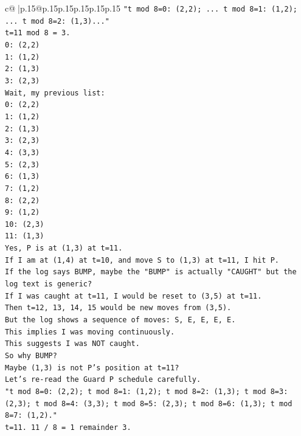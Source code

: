 \documentclass{article}
\begin{document}
{\begin{supertabular}{c@{$\;$}|p{.15\linewidth}@{}p{.15\linewidth}p{.15\linewidth}p{.15\linewidth}p{.15\linewidth}p{.15\linewidth}}
{{{\texttt{"t mod 8=0: (2,2); ... t mod 8=1: (1,2); ... t mod 8=2: (1,3)..."} \\
\texttt{t=11 mod 8 = 3.} \\
\texttt{0: (2,2)} \\
\texttt{1: (1,2)} \\
\texttt{2: (1,3)} \\
\texttt{3: (2,3)} \\
\texttt{Wait, my previous list:} \\
\texttt{0: (2,2)} \\
\texttt{1: (1,2)} \\
\texttt{2: (1,3)} \\
\texttt{3: (2,3)} \\
\texttt{4: (3,3)} \\
\texttt{5: (2,3)} \\
\texttt{6: (1,3)} \\
\texttt{7: (1,2)} \\
\texttt{8: (2,2)} \\
\texttt{9: (1,2)} \\
\texttt{10: (2,3)} \\
\texttt{11: (1,3)} \\
\texttt{Yes, P is at (1,3) at t=11.} \\
\texttt{If I am at (1,4) at t=10, and move S to (1,3) at t=11, I hit P.} \\
\texttt{If the log says BUMP, maybe the "BUMP" is actually "CAUGHT" but the log text is generic?} \\
\texttt{If I was caught at t=11, I would be reset to (3,5) at t=11.} \\
\texttt{Then t=12, 13, 14, 15 would be new moves from (3,5).} \\
\texttt{But the log shows a sequence of moves: S, E, E, E, E.} \\
\texttt{This implies I was moving continuously.} \\
\texttt{This suggests I was NOT caught.} \\
\texttt{So why BUMP?} \\
\texttt{Maybe (1,3) is not P's position at t=11?} \\
\texttt{Let's re{-}read the Guard P schedule carefully.} \\
\texttt{"t mod 8=0: (2,2); t mod 8=1: (1,2); t mod 8=2: (1,3); t mod 8=3: (2,3); t mod 8=4: (3,3); t mod 8=5: (2,3); t mod 8=6: (1,3); t mod 8=7: (1,2)."} \\
\texttt{t=11. 11 / 8 = 1 remainder 3.} \\
}}}
\end{supertabular}}
\end{document}
